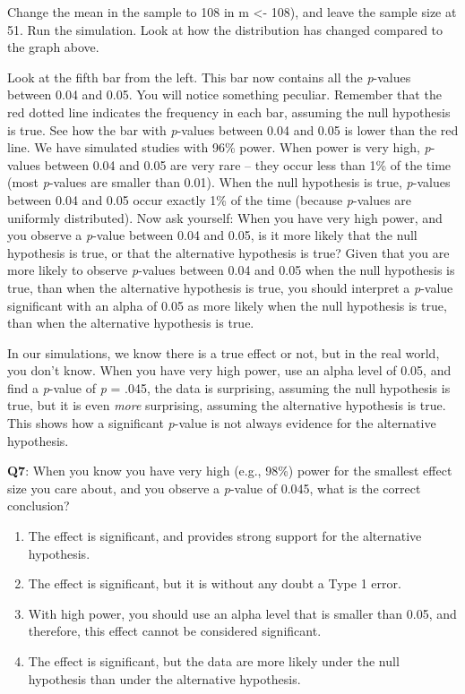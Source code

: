 \documentclass[
  oneside]{krantz}
\providecommand{\tightlist}{%
  \setlength{\itemsep}{0pt}\setlength{\parskip}{0pt}}
\begin{document}
Change the mean in the sample to 108 in m \textless- 108), and leave the sample size at 51. Run the simulation. Look at how the distribution has changed compared to the graph above.

Look at the fifth bar from the left. This bar now contains all the \emph{p}-values between 0.04 and 0.05. You will notice something peculiar. Remember that the red dotted line indicates the frequency in each bar, assuming the null hypothesis is true. See how the bar with \emph{p}-values between 0.04 and 0.05 is lower than the red line. We have simulated studies with 96\% power. When power is very high, \emph{p}-values between 0.04 and 0.05 are very rare -- they occur less than 1\% of the time (most \emph{p}-values are smaller than 0.01). When the null hypothesis is true, \emph{p}-values between 0.04 and 0.05 occur exactly 1\% of the time (because \emph{p}-values are uniformly distributed). Now ask yourself: When you have very high power, and you observe a \emph{p}-value between 0.04 and 0.05, is it more likely that the null hypothesis is true, or that the alternative hypothesis is true? Given that you are more likely to observe \emph{p}-values between 0.04 and 0.05 when the null hypothesis is true, than when the alternative hypothesis is true, you should interpret a \emph{p}-value significant with an alpha of 0.05 as more likely when the null hypothesis is true, than when the alternative hypothesis is true.

In our simulations, we know there is a true effect or not, but in the real world, you don't know. When you have very high power, use an alpha level of 0.05, and find a \emph{p}-value of \emph{p} = .045, the data is surprising, assuming the null hypothesis is true, but it is even \emph{more} surprising, assuming the alternative hypothesis is true. This shows how a significant \emph{p}-value is not always evidence for the alternative hypothesis.

\textbf{Q7}: When you know you have very high (e.g., 98\%) power for the smallest effect size you care about, and you observe a \emph{p}-value of 0.045, what is the correct conclusion?

\begin{enumerate}
\def\labelenumi{\Alph{enumi})}
\tightlist
\item
  The effect is significant, and provides strong support for the alternative hypothesis.
\item
  The effect is significant, but it is without any doubt a Type 1 error.
\item
  With high power, you should use an alpha level that is smaller than 0.05, and therefore, this effect cannot be considered significant.
\item
  The effect is significant, but the data are more likely under the null hypothesis than under the alternative hypothesis.
\end{enumerate}
\end{document}
